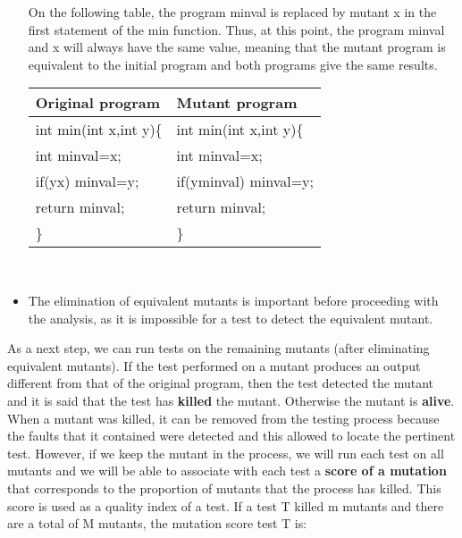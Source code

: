 \documentclass{acm_proc_article-sp}
\begin{document}
\begin{itemize}
On the following table, the program minval is replaced by mutant x in the first statement of the min function. Thus, at this point, the program minval and x will always have the same value, meaning that the mutant program is equivalent to the initial program and both programs give the same results.\\
\begin{center}
\begin{tabular}{|l|l|}
\hline Original program & Mutant program \\
\hline int min(int x,int y)\{ & int min(int x,int y)\{\\
        int minval=x; &   int minval=x; \\
        if(yx) minval=y;  &  if(yminval) minval=y;\\
        return minval;  &  return minval;\\
       \} & \}\\ \hline
\end{tabular} \vspace{0.3cm} \\
\end{center}
 \item The elimination of equivalent mutants is important before proceeding with the analysis, as it is impossible for a test to detect the equivalent mutant.
\end{itemize}
As a next step, we can run tests on the remaining mutants (after eliminating equivalent mutants). If the test performed on a mutant produces an output different from that of the original program, then the test detected the mutant and it is said that the test has \textbf{killed} the mutant. Otherwise the mutant is \textbf{alive}.\\
When a mutant was killed, it can be removed from the testing process because the faults that it contained were detected and this allowed to locate the pertinent test. However, if we keep the mutant in the process, we will run each test on all mutants and we will be able to associate with each test a \textbf{score of a mutation} that corresponds to the proportion of mutants that the process has killed. This score is used as a quality index of a test. If a test T killed m mutants and there are a total of M mutants, the mutation score test T is:
\begin{center}
\end{center}
\end{document}
